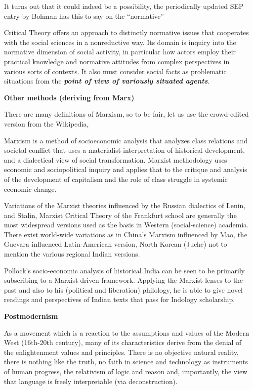 It turns out that it could indeed be a possibility, the periodically updated SEP entry by Bohman has this to say on the ``normative''
\begin{myquote}
Critical Theory offers an approach to distinctly normative issues that cooperates with the social sciences in a nonreductive way. Its domain is inquiry into the normative dimension of social activity, in particular how actors employ their practical knowledge and normative attitudes from complex perspectives in various sorts of contexts. It also must consider social facts as problematic situations from the {{\sl\bfseries point of view of variously situated agents}\relax}.
\end{myquote}

{\bf Other methods (deriving from Marx)}

There are many definitions of Marxism, so to be fair, let us use the crowd-edited version from the Wikipedia, 
\begin{myquote}
Marxism is a method of socioeconomic analysis that analyzes class relations and societal conflict that uses a materialist interpretation of historical development, and a dialectical view of social transformation. Marxist methodology uses economic and sociopolitical inquiry and applies that to the critique and analysis of the development of capitalism and the role of class struggle in systemic economic change.
\end{myquote}

Variations of the Marxist theories influenced by the Russian dialectics of Lenin, and Stalin, Marxist Critical Theory of the Frankfurt school are generally the most widespread versions used as the basis in Western (social-science) academia. There exist world-wide variations as in China's Marxism influenced by Mao, the Guevara influenced Latin-American version, North Korean (Juche) not to mention the various regional Indian versions.

Pollock's socio-economic analysis of historical India can be seen to be primarily subscribing to a Marxist-driven framework. Applying the Marxist lenses to the past and also to his (political and liberation) philology, he is able to give novel readings and perspectives of Indian texts that pass for Indology scholarship.

{\bf Postmodernism}

As a movement which is a reaction to the assumptions and values of the Modern West (16th-20th century), many of its characteristics derive from the denial of the enlightenment values and principles. There is no objective natural reality, there is nothing like the truth, no faith in science and technology as instruments of human progress, the relativism of logic and reason and, importantly, the view that language is freely interpretable (via deconstruction). 

